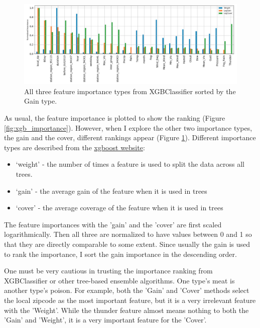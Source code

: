 \documentclass[a4paper]{article}
\begin{document}
			\begin{figure}
				\centering
				\includegraphics[width=1\textwidth]{Importances.png}
				\caption{\label{fig:importances}All three feature importance types from XGBClassifier sorted by the Gain type.}	
			\end{figure}	

			As usual, the feature importance is plotted to show the ranking (Figure \ref{fig:xgb_importance}). However, when I explore the other two importance types, the gain and the cover, different rankings appear (Figure \ref{fig:importances}). Different importance types are described from the \href{http://xgboost.readthedocs.io/en/latest/python/python_api.html}{xgboost website}:
			
			\begin{leftbar}
				\begin{itemize}
					\item ‘weight’ - the number of times a feature is used to split the data across all trees. 
					\item ‘gain’ - the average gain of the feature when it is used in trees 
					\item ‘cover’ - the average coverage of the feature when it is used in trees
				\end{itemize}				
			\end{leftbar}
			
			The feature importances with the 'gain' and the 'cover' are first scaled logarithmically. Then all three are normalized to have values between 0 and 1 so that they are directly comparable to some extent. Since usually the gain is used to rank the importance, I sort the gain importance in the descending order. 

			One must be very cautious in trusting the importance ranking from XGBClassifier or other tree-based ensemble algorithms. One type's meat is another type's poison. For example, both the 'Gain' and 'Cover' methods select the local zipcode as the most important feature, but it is a very irrelevant feature with the 'Weight'. While the thunder feature almost means nothing to both the 'Gain' and 'Weight', it is a very important feature for the 'Cover'.
			
\end{document}
